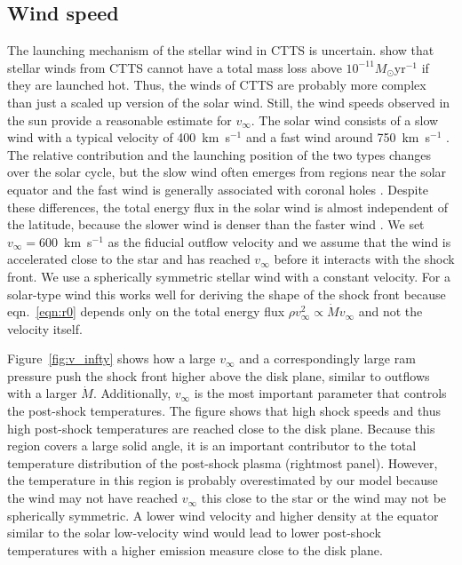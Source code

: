 \documentclass{emulateapj}
\begin{document}
\subsection{Wind speed}
The launching mechanism of the stellar wind in CTTS is uncertain. \citet{2007IAUS..243..299M} show that stellar winds from CTTS cannot have a total mass loss above $10^{-11}M_\odot\mathrm{ yr}^{-1}$ if they are launched hot. 
Thus, the winds of CTTS are probably more complex than just a scaled up version of the solar wind. Still, the wind speeds observed in the sun provide a reasonable estimate for $v_\infty$. The solar wind consists of a slow wind with a typical velocity of 400~km~s$^{-1}$ and a fast wind around 750~km~s$^{-1}$ \citep{2005JGRA..110.7109F}. The relative contribution and the launching position of the two types changes over the solar cycle, but the slow wind often emerges from regions near the solar equator and the fast wind is generally associated with coronal holes \citep{1999GeoRL..26.2901G,2003A&A...408.1165B,2009LRSP....6....3C}. Despite these differences, the total energy flux in the solar wind is almost independent of the latitude, because the slower wind is denser than the faster wind \citep{2012SoPh..279..197L}. We set $v_\infty=600$~km~s$^{-1}$ as the fiducial outflow velocity and we assume that the wind is accelerated close to the star and has reached $v_\infty$ before it interacts with the shock front. We use a spherically symmetric stellar wind with a constant velocity. For a solar-type wind this works well for deriving the shape of the shock front because eqn.~\ref{eqn:r0} depends only on the total energy flux $\rho v^2_\infty \propto \dot M v_\infty$ and not the velocity itself. 

Figure~\ref{fig:v_infty} shows how a large $v_\infty$ and a correspondingly large ram pressure push the shock front higher above the disk plane, similar to outflows with a larger $\dot M$. Additionally, $v_\infty$ is the most important parameter that controls the post-shock temperatures.
The figure shows that high shock speeds and thus high post-shock temperatures are reached close to the disk plane. Because this region covers a large solid angle, it is an important contributor to the total temperature distribution of the post-shock plasma (rightmost panel). However, the temperature in this region is probably overestimated by our model because the wind may not have reached $v_\infty$ this close to the star or the wind may not be spherically symmetric. A lower wind velocity and higher density at the equator similar to the solar low-velocity wind would lead to lower post-shock temperatures with a higher emission measure close to the disk plane.
\end{document}
